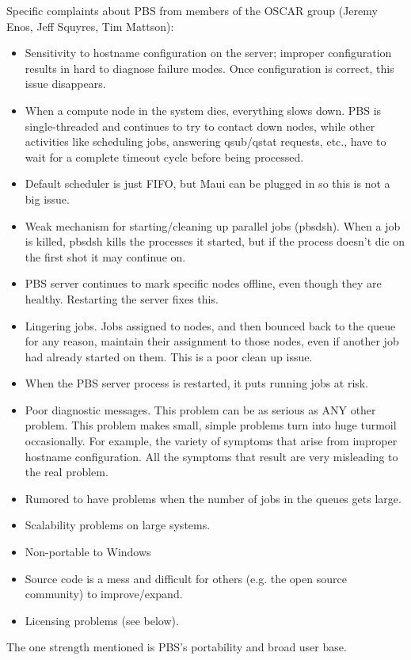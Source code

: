 \documentclass{article}
\begin{document}
Specific complaints about PBS from members of the OSCAR group (Jeremy Enos,
Jeff Squyres, Tim Mattson):
\begin{itemize}
\item Sensitivity to hostname configuration on the server; improper
      configuration results in hard to diagnose failure modes.  Once
      configuration is correct, this issue disappears.
\item When a compute node in the system dies, everything slows down.
      PBS is single-threaded and continues to try to contact down nodes,
      while other activities like scheduling jobs, answering qsub/qstat
      requests, etc., have to wait for a complete timeout cycle before being
      processed.
\item Default scheduler is just FIFO, but Maui can be plugged in so this
      is not a big issue.
\item Weak mechanism for starting/cleaning up parallel jobs (pbsdsh).
      When a job is killed, pbsdsh kills the processes it started, but
      if the process doesn't die on the first shot it may continue on.
\item PBS server continues to mark specific nodes offline, even though they
      are healthy.  Restarting the server fixes this.
\item Lingering jobs.  Jobs assigned to nodes, and then bounced back to the
      queue for any reason, maintain their assignment to those nodes, even
      if another job had already started on them.  This is a poor clean up
      issue.
\item When the PBS server process is restarted, it puts running jobs at risk.
\item Poor diagnostic messages.  This problem can be as serious as ANY other
      problem.  This problem makes small, simple problems turn into huge
      turmoil occasionally.  For example, the variety of symptoms that arise
      from improper hostname configuration.  All the symptoms that result are
      very misleading to the real problem.
\item Rumored to have problems when the number of jobs in the queues gets
      large.
\item Scalability problems on large systems.
\item Non-portable to Windows
\item Source code is a mess and difficult for others (e.g. the open source
      community) to improve/expand.
\item Licensing problems (see below).
\end{itemize}
The one strength mentioned is PBS's portability and broad user base.
\end{document}
